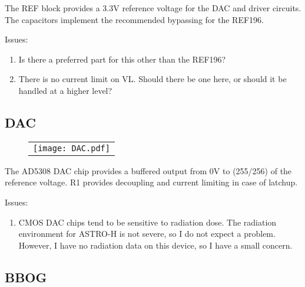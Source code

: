 \documentclass[a4paper,12pt]{article}
\begin{document}
The REF block provides a 3.3V reference voltage for the DAC and driver circuits. The capacitors implement the recommended bypassing for the REF196.

Issues:
\begin{enumerate}
\item
Is there a preferred part for this other than the REF196?
\item
There is no current limit on VL. Should there be one here, or should it be handled at a higher level?
\end{enumerate}

\subsection{DAC}
   \begin{figure}
   \begin{center}
   \begin{tabular}{c}
   \texttt{[image: DAC.pdf]}
   \end{tabular}
   \end{center}
   \end{figure}
The AD5308 DAC chip provides a buffered output from 0V to (255/256) of the reference voltage. R1 provides decoupling and current limiting in case of latchup.

Issues:
\begin{enumerate}
\item
CMOS DAC chips tend to be sensitive to radiation dose. The radiation environment for ASTRO-H is not severe, so I do not expect a problem. However, I have no radiation data on this device, so I have a small concern.
\end{enumerate}

\subsection{BBOG}
\end{document}
